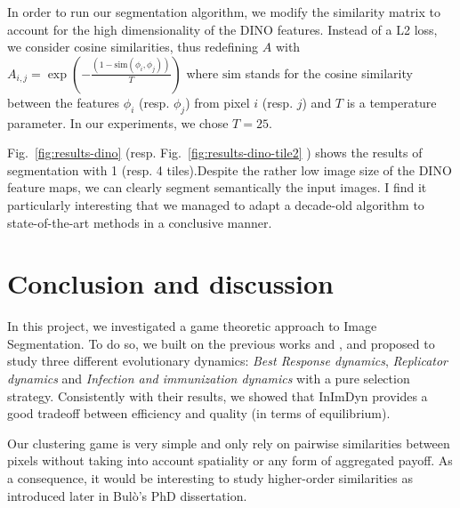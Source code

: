 \documentclass[11pt,a4paper]{article}
\begin{document}
In order to run our segmentation algorithm, we modify the similarity matrix to account for the high dimensionality of the DINO features. Instead of a L2 loss, we consider cosine similarities, thus redefining $A$ with $A_{i, j}=\exp\left(-\frac{(1-\text{sim}(\phi_i, \phi_j))}{T}\right)$ where $\text{sim}$ stands for the cosine similarity between the features $\phi_i$ (resp. $\phi_j$) from pixel $i$ (resp. $j$) and $T$ is a temperature parameter. In our experiments, we chose $T=25$.

Fig.~\ref{fig:results-dino} (resp. Fig.~\ref{fig:results-dino-tile2} ) shows the results of segmentation with 1 (resp. 4 tiles).Despite the rather low image size of the DINO feature maps, we can clearly segment semantically the input images. I find it particularly interesting that we managed to adapt a decade-old algorithm to state-of-the-art methods in a conclusive manner.

\section{Conclusion and discussion}

In this project, we investigated a game theoretic approach to Image Segmentation. To do so, we built on the previous works \cite{bulo-thesis} and \cite{game-clustering}, and proposed to study three different evolutionary dynamics: \textit{Best Response dynamics}, \textit{Replicator dynamics} and \textit{Infection and immunization dynamics} with a pure selection strategy. Consistently with their results, we showed that InImDyn provides a good tradeoff between efficiency and quality (in terms of equilibrium).

Our clustering game is very simple and only rely on pairwise similarities between pixels without taking into account spatiality or any form of aggregated payoff. As a consequence, it would be interesting to study higher-order similarities as introduced later in Bulò's PhD dissertation\cite{bulo-thesis}.



\end{document}
